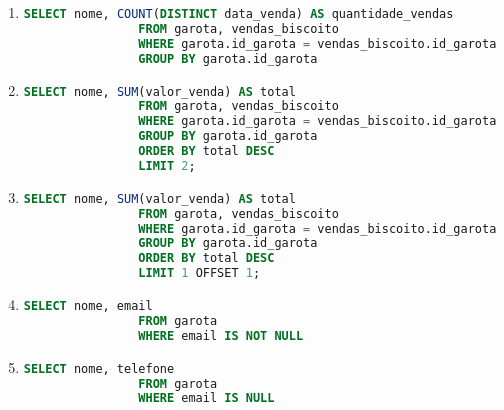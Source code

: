 \documentclass{article}
\begin{document}
\begin{enumerate}[label=\alph*.]
\begin{enumerate}[label=\roman*., labelsep=0.5em, leftmargin=*]
        \item 
        \begin{adjustwidth}{1em}{0pt}
            \begin{lstlisting}[language=SQL]
                SELECT nome, COUNT(DISTINCT data_venda) AS quantidade_vendas
                FROM garota, vendas_biscoito
                WHERE garota.id_garota = vendas_biscoito.id_garota
                GROUP BY garota.id_garota
            \end{lstlisting}
        \end{adjustwidth}
        
        \item 
        \begin{adjustwidth}{1em}{0pt}
            \begin{lstlisting}[language=SQL]
                SELECT nome, SUM(valor_venda) AS total
                FROM garota, vendas_biscoito
                WHERE garota.id_garota = vendas_biscoito.id_garota
                GROUP BY garota.id_garota
                ORDER BY total DESC
                LIMIT 2;
            \end{lstlisting}
        \end{adjustwidth}

        \item 
        \begin{adjustwidth}{1em}{0pt}
            \begin{lstlisting}[language=SQL]
                SELECT nome, SUM(valor_venda) AS total
                FROM garota, vendas_biscoito
                WHERE garota.id_garota = vendas_biscoito.id_garota
                GROUP BY garota.id_garota
                ORDER BY total DESC
                LIMIT 1 OFFSET 1;
            \end{lstlisting}
        \end{adjustwidth}

        \item 
        \begin{adjustwidth}{1em}{0pt}
            \begin{lstlisting}[language=SQL]
                SELECT nome, email
                FROM garota
                WHERE email IS NOT NULL
            \end{lstlisting}
        \end{adjustwidth}

        \item 
        \begin{adjustwidth}{1em}{0pt}
            \begin{lstlisting}[language=SQL]
                SELECT nome, telefone
                FROM garota
                WHERE email IS NULL
            \end{lstlisting}
        \end{adjustwidth}


\end{enumerate}
\end{enumerate}
\end{document}
